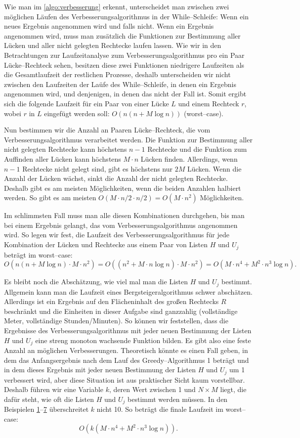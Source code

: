 Wie man im \cref{algo:verbesserung} erkennt, unterscheidet man zwischen zwei möglichen
Läufen des Verbesserungsalgorithmus in der While--Schleife:
Wenn ein neues Ergebnis angenommen wird und falls nicht.
Wenn ein Ergebnis angenommen wird, muss man zusätzlich die Funktionen zur Bestimmung aller Lücken und aller nicht gelegten
Rechtecke laufen lassen.
Wie wir in den Betrachtungen zur Laufzeitanalyse zum Verbesserungsalgorithmus pro ein Paar Lücke--Rechteck 
sehen, besitzen diese zwei Funktionen niedrigere
Laufzeiten als die Gesamtlaufzeit der restlichen Prozesse, deshalb unterscheiden wir
nicht zwischen den Laufzeiten der Laüfe des While--Schleife, in denen ein Ergebnis 
angenommen wird, und denjenigen, in denen das nicht der Fall ist.
Somit ergibt sich die folgende Laufzeit für ein Paar von einer Lücke $L$ und einem Rechteck $r$,
wobei $r$ in $L$ eingefügt werden soll: $O(n(n + M \log n))$ (worst--case).

Nun bestimmen wir die Anzahl an Paaren Lücke--Rechteck, die vom Verbesserungsalgorithmus
verarbeitet werden. Die Funktion zur Bestimmung aller nicht gelegten Rechtecke kann
höchstens $n-1$ Rechtecke und die Funktion zum Auffinden aller Lücken kann 
höchstens $M \cdot n$ Lücken finden.
Allerdings, wenn $n-1$ Rechtecke nicht gelegt sind, gibt es höchstens nur $2M$ Lücken.
Wenn die Anzahl der Lücken wächst, sinkt die Anzahl der nicht gelegten Rechtecke.
Deshalb gibt es am meisten Möglichkeiten, wenn die beiden Anzahlen halbiert werden.
So gibt es am meisten $O(M \cdot n/2 \cdot n/2) = O(M \cdot n^2)$ Möglichkeiten.

Im schlimmsten Fall muss man alle diesen Kombinationen durchgehen, bis man
bei einem Ergebnis gelangt, das vom Verbesserungsalgorithmus angenommen wird.
So legen wir fest, die Laufzeit des Verbesserungsalgorithmus
für jede Kombination der Lücken und Rechtecke aus einem Paar von Listen $H$ und $U_j$
beträgt im worst--case:
\[
	O(n(n + M \log n) \cdot M \cdot n^2) = O((n^2 + M \cdot n \log n) \cdot M \cdot n^2)
	= O(M \cdot n^4 + M^2 \cdot n^3 \log n).
\]

Es bleibt noch die Abschätzung, wie viel mal man die Listen $H$ und $U_j$ bestimmt.
Allgemein kann man die Laufzeit eines Bergsteigeralgorithmus schwer abschätzen.
Allerdings ist ein Ergebnis auf den Flächeninhalt des großen Rechtecks $R$ beschränkt
und die Einheiten in dieser Aufgabe sind ganzzahlig (vollständige Meter, vollständige Stunden/Minuten).
So können wir feststellen, dass die Ergebnisse des Verbesserungsalgorithmus mit jeder
neuen Bestimmung der Listen $H$ und $U_j$ eine streng monoton wachsende Funktion bilden.
Es gibt also eine feste Anzahl an möglichen Verbesserungen.
Theoretisch könnte es einen Fall geben, in dem das Anfangsergebnis nach dem Lauf
des Greedy--Algorithmus 1 beträgt und in dem dieses Ergebnis mit jeder 
neuen Bestimmung der Listen $H$ und $U_j$ um 1 verbessert wird,
aber diese Situation ist aus praktischer Sicht kaum vorstellbar. 
Deshalb führen wir eine Variable $k$, deren Wert zwischen 1 und $N \times M$ liegt, die
dafür steht, wie oft die Listen $H$ und $U_j$ bestimmt werden müssen.
In den Beispielen \hyperref[ex:1]{1}--\hyperref[ex:7]{7} überschreitet $k$ nicht 10.
So beträgt die finale Laufzeit im worst--case:
\[
	O(k(M \cdot n^4 + M^2 \cdot n^3 \log n)).
\]
